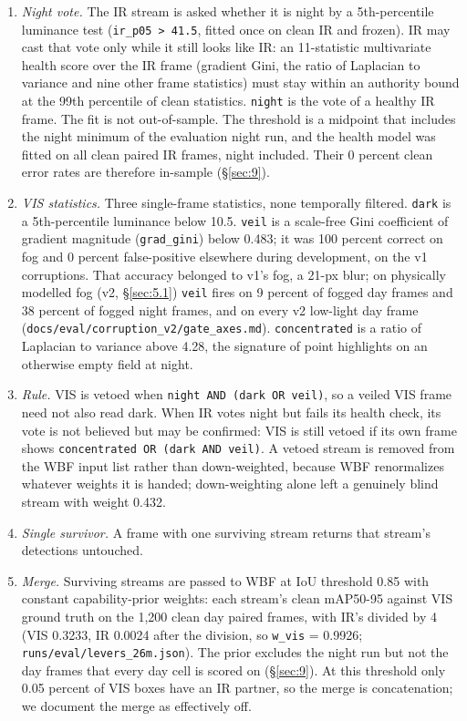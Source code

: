 \documentclass[10pt]{article}
\begin{document}
\begin{enumerate}
\item \emph{Night vote.} The IR stream is asked whether it is night by a 5th-percentile luminance test (\texttt{ir\_\allowbreak{}p05 > 41.5}, fitted once on clean IR and frozen). IR may cast that vote only while it still looks like IR: an 11-statistic multivariate health score over the IR frame (gradient Gini, the ratio of Laplacian to variance and nine other frame statistics) must stay within an authority bound at the 99th percentile of clean statistics. \texttt{night} is the vote of a healthy IR frame. The fit is not out-of-sample. The threshold is a midpoint that includes the night minimum of the evaluation night run, and the health model was fitted on all clean paired IR frames, night included. Their 0 percent clean error rates are therefore in-sample (\S\ref{sec:9}).
\item \emph{VIS statistics.} Three single-frame statistics, none temporally filtered. \texttt{dark} is a 5th-percentile luminance below 10.5. \texttt{veil} is a scale-free Gini coefficient of gradient magnitude (\texttt{grad\_\allowbreak{}gini}) below 0.483; it was 100 percent correct on fog and 0 percent false-positive elsewhere during development, on the v1 corruptions. That accuracy belonged to v1's fog, a 21-px blur; on physically modelled fog (v2, \S\ref{sec:5.1}) \texttt{veil} fires on 9 percent of fogged day frames and 38 percent of fogged night frames, and on every v2 low-light day frame (\texttt{docs/\allowbreak{}eval/\allowbreak{}corruption\_\allowbreak{}v2/\allowbreak{}gate\_\allowbreak{}axes.md}). \texttt{concentrated} is a ratio of Laplacian to variance above 4.28, the signature of point highlights on an otherwise empty field at night.
\item \emph{Rule.} VIS is vetoed when \texttt{night AND (dark OR veil)}, so a veiled VIS frame need not also read dark. When IR votes night but fails its health check, its vote is not believed but may be confirmed: VIS is still vetoed if its own frame shows \texttt{concentrated OR (dark AND veil)}. A vetoed stream is removed from the WBF input list rather than down-weighted, because WBF renormalizes whatever weights it is handed; down-weighting alone left a genuinely blind stream with weight 0.432.
\item \emph{Single survivor.} A frame with one surviving stream returns that stream's detections untouched.
\item \emph{Merge.} Surviving streams are passed to WBF at IoU threshold 0.85 with constant capability-prior weights: each stream's clean mAP50-95 against VIS ground truth on the 1,200 clean day paired frames, with IR's divided by 4 (VIS 0.3233, IR 0.0024 after the division, so \texttt{w\_\allowbreak{}vis} = 0.9926; \texttt{runs/\allowbreak{}eval/\allowbreak{}levers\_\allowbreak{}26m.json}). The prior excludes the night run but not the day frames that every day cell is scored on (\S\ref{sec:9}). At this threshold only 0.05 percent of VIS boxes have an IR partner, so the merge is concatenation; we document the merge as effectively off.

\end{enumerate}
\end{document}
